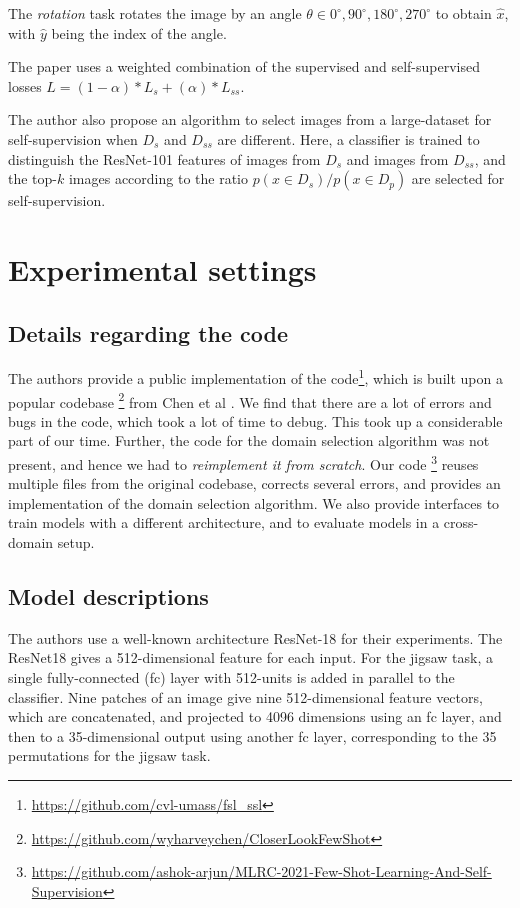 The \textit{rotation} task rotates the image by an angle $\theta \in {0^{\circ}, 90^{\circ}, 180^{\circ}, 270^{\circ}}$ to obtain $\hat{x}$, with $\hat{y}$ being the index of the angle.

The paper uses a weighted combination of the supervised and self-supervised losses $L = (1-\alpha)*L_s + (\alpha)*L_{ss}$. 

The author also propose an algorithm to select images from a large-dataset for self-supervision when $D_s$ and $D_{ss}$ are different. Here, a classifier is trained to distinguish the ResNet-101 features of images from $D_s$ and images from $D_{ss}$, and the top-$k$ images according to the ratio $p(x \in D_s) / p(x \in D_p)$ are selected for self-supervision. 

\section{Experimental settings}

\subsection{Details regarding the code}

The authors provide a public implementation of the code\footnote[1]{\url{https://github.com/cvl-umass/fsl\_ssl}}, which is built upon a popular codebase \footnote[2]{\url{https://github.com/wyharveychen/CloserLookFewShot}} from Chen et al \cite{chen2018a}. We find that there are a lot of errors and bugs in the code, which took a lot of time to debug. This took up a considerable part of  our time. Further, the code for the domain selection algorithm was not present, and hence we had to \textit{reimplement it from scratch}. Our code \footnote[3]{\url{https://github.com/ashok-arjun/MLRC-2021-Few-Shot-Learning-And-Self-Supervision}} reuses multiple files from the original codebase, corrects several errors, and provides an implementation of the domain selection algorithm. We also provide interfaces to train models with a different architecture, and to evaluate models in a cross-domain setup.

\subsection{Model descriptions}

The authors use a well-known architecture ResNet-18 for their experiments. The ResNet18 gives a 512-dimensional feature for each input. For the jigsaw task, a single fully-connected (fc) layer with 512-units is added in parallel to the classifier. Nine patches of an image give nine 512-dimensional feature vectors, which are concatenated, and projected to 4096 dimensions using an fc layer, and then to a 35-dimensional output using another fc layer, corresponding to the 35 permutations for the jigsaw task. 

